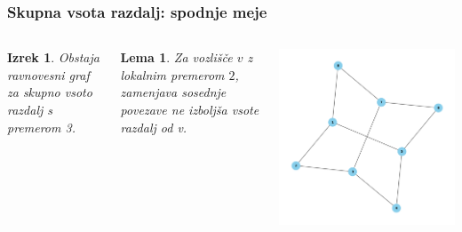 \documentclass[12pt, hyperref={unicode}]{beamer}
\newtheorem{izrek}{Izrek}
\newtheorem{lema}{Lema}
\begin{document}
\begin{frame}
  
  \frametitle{Skupna vsota razdalj: spodnje meje}
  \begin{columns}
    \begin{izrek}
        Obstaja ravnovesni graf za skupno vsoto razdalj s premerom 3.
      \end{izrek}
      \begin{lema}
        Za vozlišče $v$ z lokalnim premerom $2$, zamenjava sosednje povezave ne izboljša
        vsote razdalj od v.
      \end{lema}
    \includegraphics[width=1\textwidth]{vsota_premer_3.png}
  \end{columns}
  
\end{frame}

\end{document}
